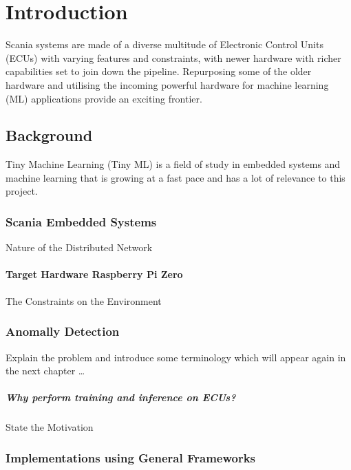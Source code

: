 \part{Introduction}

Scania systems are made of a diverse multitude of Electronic Control Units (ECUs) with varying features and constraints, with newer hardware with richer capabilities set to join down the pipeline. Repurposing some of the older hardware and utilising the incoming powerful hardware for machine learning (ML) applications provide an exciting frontier.

\chapter{Background}

Tiny Machine Learning (Tiny ML) is a field of study in embedded systems and machine learning that is growing at a fast pace and has a lot of relevance to this project.

\section{Scania Embedded Systems}

Nature of the Distributed Network

\subsection[Target Hardware]{Target Hardware \linebreak[2]Raspberry Pi Zero}

The Constraints on the Environment

\section{Anomally Detection}

Explain the problem and introduce some terminology which will appear again in the next chapter \dots

\subsubsection{Why perform training and inference on ECUs?}
State the Motivation

\section{Implementations using General Frameworks}

